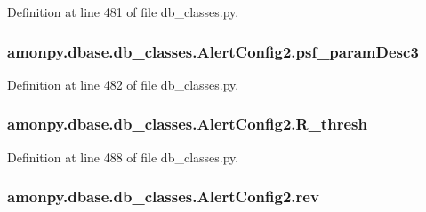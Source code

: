 Definition at line 481 of file db\-\_\-classes.\-py.

\hypertarget{classamonpy_1_1dbase_1_1db__classes_1_1_alert_config2_ab6fedbe0c3c5ddec221dd40f2118c3da}{
\subsubsection[{psf\-\_\-param\-Desc3}]{\setlength{\rightskip}{0pt plus 5cm}amonpy.\-dbase.\-db\-\_\-classes.\-Alert\-Config2.\-psf\-\_\-param\-Desc3}}\label{classamonpy_1_1dbase_1_1db__classes_1_1_alert_config2_ab6fedbe0c3c5ddec221dd40f2118c3da}


Definition at line 482 of file db\-\_\-classes.\-py.

\hypertarget{classamonpy_1_1dbase_1_1db__classes_1_1_alert_config2_a94dabae815e574e6453b65d4efd9c0b0}{
\subsubsection[{R\-\_\-thresh}]{\setlength{\rightskip}{0pt plus 5cm}amonpy.\-dbase.\-db\-\_\-classes.\-Alert\-Config2.\-R\-\_\-thresh}}\label{classamonpy_1_1dbase_1_1db__classes_1_1_alert_config2_a94dabae815e574e6453b65d4efd9c0b0}


Definition at line 488 of file db\-\_\-classes.\-py.

\hypertarget{classamonpy_1_1dbase_1_1db__classes_1_1_alert_config2_a44f00e5625906d6af0bda3a6f99f9c99}{
\subsubsection[{rev}]{\setlength{\rightskip}{0pt plus 5cm}amonpy.\-dbase.\-db\-\_\-classes.\-Alert\-Config2.\-rev}}\label{classamonpy_1_1dbase_1_1db__classes_1_1_alert_config2_a44f00e5625906d6af0bda3a6f99f9c99}


